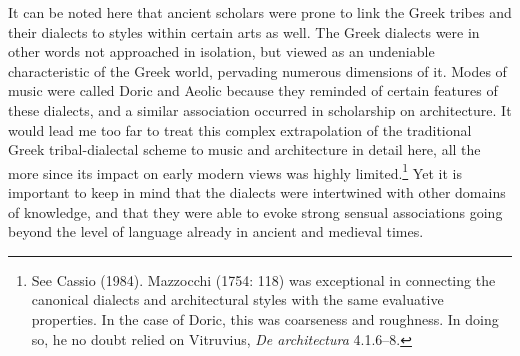\begin{styleStandard}
It can be noted here that ancient scholars were prone to link the Greek tribes and their dialects to styles within certain arts as well. The Greek dialects were in other words not approached in isolation, but viewed as an undeniable characteristic of the Greek world, pervading numerous dimensions of it. Modes of music were called Doric and Aeolic because they reminded of certain features of these dialects, and a similar association occurred in scholarship on architecture. It would lead me too far to treat this complex extrapolation of the traditional Greek tribal-dialectal scheme to music and architecture in detail here, all the more since its impact on early modern views was highly limited.\footnote{ See Cassio (1984). Mazzocchi (1754: 118) was exceptional in connecting the canonical dialects and architectural styles with the same evaluative properties. In the case of Doric, this was coarseness and roughness. In doing so, he no doubt relied on Vitruvius, \textit{De architectura} 4.1.6–8.} Yet it is important to keep in mind that the dialects were intertwined with other domains of knowledge, and that they were able to evoke strong sensual associations going beyond the level of language already in ancient and medieval times.
\end{styleStandard}

